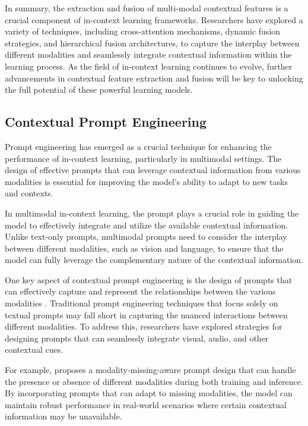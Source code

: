 \documentclass[11pt]{article}
\begin{document}
In summary, the extraction and fusion of multi-modal contextual features is a crucial component of in-context learning frameworks. Researchers have explored a variety of techniques, including cross-attention mechanisms, dynamic fusion strategies, and hierarchical fusion architectures, to capture the interplay between different modalities and seamlessly integrate contextual information within the learning process. As the field of in-context learning continues to evolve, further advancements in contextual feature extraction and fusion will be key to unlocking the full potential of these powerful learning models.

\subsection{Contextual Prompt Engineering}

Prompt engineering has emerged as a crucial technique for enhancing the performance of in-context learning, particularly in multimodal settings. The design of effective prompts that can leverage contextual information from various modalities is essential for improving the model's ability to adapt to new tasks and contexts.

In multimodal in-context learning, the prompt plays a crucial role in guiding the model to effectively integrate and utilize the available contextual information. Unlike text-only prompts, multimodal prompts need to consider the interplay between different modalities, such as vision and language, to ensure that the model can fully leverage the complementary nature of the contextual information.

One key aspect of contextual prompt engineering is the design of prompts that can effectively capture and represent the relationships between the various modalities \cite{ref178}. Traditional prompt engineering techniques that focus solely on textual prompts may fall short in capturing the nuanced interactions between different modalities. To address this, researchers have explored strategies for designing prompts that can seamlessly integrate visual, audio, and other contextual cues.

For example, \cite{ref179} proposes a modality-missing-aware prompt design that can handle the presence or absence of different modalities during both training and inference. By incorporating prompts that can adapt to missing modalities, the model can maintain robust performance in real-world scenarios where certain contextual information may be unavailable.
\end{document}
